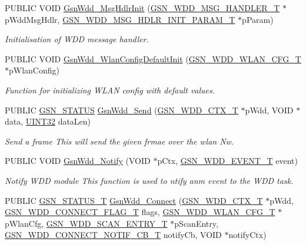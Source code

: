 \begin{DoxyCompactItemize}
\item 
PUBLIC VOID \hyperlink{a00677_gad16cf4ccb5b16d0a9bd6a9b18384c8d9}{GsnWdd\_\-MsgHdlrInit} (\hyperlink{a00279}{GSN\_\-WDD\_\-MSG\_\-HANDLER\_\-T} $\ast$pWddMsgHdlr, \hyperlink{a00280}{GSN\_\-WDD\_\-MSG\_\-HDLR\_\-INIT\_\-PARAM\_\-T} $\ast$pParam)
\begin{DoxyCompactList}\small\item\em Initialisation of WDD message handler. \end{DoxyCompactList}\item 
PUBLIC VOID \hyperlink{a00677_gab31391ef7af2845ebae8b20e56912e90}{GsnWdd\_\-WlanConfigDefaultInit} (\hyperlink{a00302}{GSN\_\-WDD\_\-WLAN\_\-CFG\_\-T} $\ast$pWlanConfig)
\begin{DoxyCompactList}\small\item\em Function for initializing WLAN config with default values. \end{DoxyCompactList}\item 
PUBLIC \hyperlink{a00660_gada5951904ac6110b1fa95e51a9ddc217}{GSN\_\-STATUS} \hyperlink{a00677_ga2c932ee5c2900c450040a2af92048cd0}{GsnWdd\_\-Send} (\hyperlink{a00108}{GSN\_\-WDD\_\-CTX\_\-T} $\ast$pWdd, VOID $\ast$data, \hyperlink{a00660_gae1e6edbbc26d6fbc71a90190d0266018}{UINT32} dataLen)
\begin{DoxyCompactList}\small\item\em Send a frame This will send the given frmae over the wlan Nw. \end{DoxyCompactList}\item 
PUBLIC VOID \hyperlink{a00677_ga3b57a234af35c0dc77fa3760a2f3f07f}{GsnWdd\_\-Notify} (VOID $\ast$pCtx, \hyperlink{a00677_ga82734573aab1decd3ffd115af490f892}{GSN\_\-WDD\_\-EVENT\_\-T} event)
\begin{DoxyCompactList}\small\item\em Notify WDD module This function is used to ntify anm event to the WDD task. \end{DoxyCompactList}\item 
PUBLIC \hyperlink{a00659_gae36517c0f5872426a7034c9551eb96ac}{GSN\_\-STATUS\_\-T} \hyperlink{a00603_a03380e1642f9c5608bc3cf0b966991aa}{GsnWdd\_\-Connect} (\hyperlink{a00108}{GSN\_\-WDD\_\-CTX\_\-T} $\ast$pWdd, \hyperlink{a00677_ga3a599f8d47bbbf9108f9156cddf9bd4b}{GSN\_\-WDD\_\-CONNECT\_\-FLAG\_\-T} flags, \hyperlink{a00302}{GSN\_\-WDD\_\-WLAN\_\-CFG\_\-T} $\ast$pWlanCfg, \hyperlink{a00400}{GSN\_\-WDD\_\-SCAN\_\-ENTRY\_\-T} $\ast$pScanEntry, \hyperlink{a00603_afa291ab10917d97cae6b9207522e623b}{GSN\_\-WDD\_\-CONNECT\_\-NOTIF\_\-CB\_\-T} notifyCb, VOID $\ast$notifyCtx)

\end{DoxyCompactItemize}
